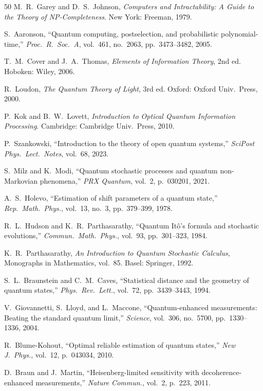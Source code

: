 \documentclass[journal,twocolumn]{IEEEtran}
\theoremstyle{definition}
\theoremstyle{plain}
\begin{document}
\begin{thebibliography}{50}
M.~R.~Garey and D.~S.~Johnson,
\emph{Computers and Intractability: A Guide to the Theory of
NP-Completeness}. New York: Freeman, 1979.

S.~Aaronson, ``Quantum computing, postselection, and probabilistic
polynomial-time,'' \emph{Proc.\ R.\ Soc.\ A}, vol.~461, no.~2063,
pp.~3473--3482, 2005.

T.~M.~Cover and J.~A.~Thomas, \emph{Elements of Information Theory},
2nd ed. Hoboken: Wiley, 2006.

R.~Loudon, \emph{The Quantum Theory of Light}, 3rd ed.
Oxford: Oxford Univ.\ Press, 2000.

P.~Kok and B.~W.~Lovett,
\emph{Introduction to Optical Quantum Information Processing}.
Cambridge: Cambridge Univ.\ Press, 2010.

P.~Szankowski, ``Introduction to the theory of open quantum
systems,'' \emph{SciPost Phys.\ Lect.\ Notes}, vol.~68, 2023.

S.~Milz and K.~Modi, ``Quantum stochastic processes and quantum
non-Markovian phenomena,'' \emph{PRX Quantum}, vol.~2,
p.~030201, 2021.

A.~S.~Holevo, ``Estimation of shift parameters of a quantum state,''
\emph{Rep.\ Math.\ Phys.}, vol.~13, no.~3, pp.~379--399, 1978.

R.~L.~Hudson and K.~R.~Parthasarathy, ``Quantum It\^{o}'s formula
and stochastic evolutions,'' \emph{Commun.\ Math.\ Phys.},
vol.~93, pp.~301--323, 1984.

K.~R.~Parthasarathy, \emph{An Introduction to Quantum Stochastic
Calculus}, Monographs in Mathematics, vol.~85.
Basel: Springer, 1992.

S.~L.~Braunstein and C.~M.~Caves, ``Statistical distance and the
geometry of quantum states,'' \emph{Phys.\ Rev.\ Lett.},
vol.~72, pp.~3439--3443, 1994.

V.~Giovannetti, S.~Lloyd, and L.~Maccone,
``Quantum-enhanced measurements: Beating the standard quantum
limit,'' \emph{Science}, vol.~306, no.~5700, pp.~1330--1336, 2004.

R.~Blume-Kohout, ``Optimal reliable estimation of quantum states,''
\emph{New J.\ Phys.}, vol.~12, p.~043034, 2010.

D.~Braun and J.~Martin, ``Heisenberg-limited sensitivity with
decoherence-enhanced measurements,'' \emph{Nature Commun.},
vol.~2, p.~223, 2011.


\end{thebibliography}
\end{document}

